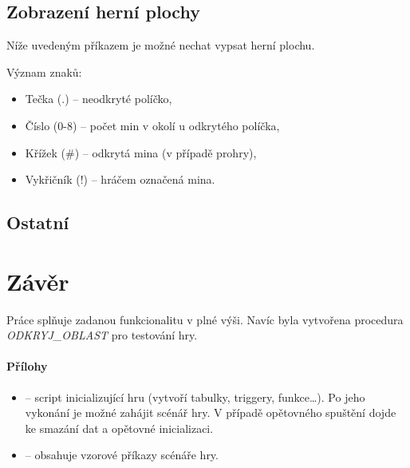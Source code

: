 \documentclass[12pt, a4paper]{article}
\begin{document}
\subsection{Zobrazení herní plochy}
Níže uvedeným příkazem je možné nechat vypsat herní plochu.


\noindent
Význam znaků:
\begin{itemize}
	\item Tečka (.) -- neodkryté políčko,
	\item Číslo (0-8) -- počet min v okolí u odkrytého políčka,
	\item Křížek (\#) -- odkrytá mina (v případě prohry),
	\item Vykřičník (!) -- hráčem označená mina.
\end{itemize}

\subsection{Ostatní}


\section{Závěr}
Práce splňuje zadanou funkcionalitu v plné výši.
Navíc byla vytvořena procedura \emph{ODKRYJ\_OBLAST} pro testování hry.

\paragraph{Přílohy}
\begin{itemize}
	\item {} -- script inicializující hru (vytvoří tabulky, triggery, funkce\dots). Po jeho vykonání je možné zahájit scénář hry. V případě opětovného spuštění dojde ke smazání dat a opětovné inicializaci.
	\item {} -- obsahuje vzorové příkazy scénáře hry.
\end{itemize}
\end{document}
